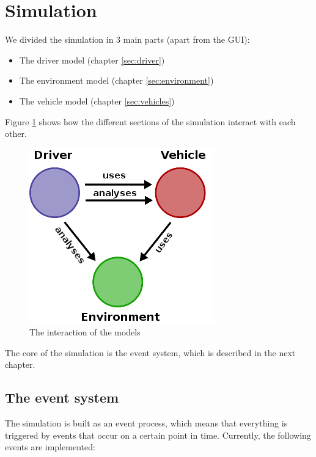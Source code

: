 
\section{Simulation}
\label{sec:simulation}

We divided the simulation in 3 main parts (apart from the GUI): \\

\begin{itemize}
\item The driver model (chapter \ref{sec:driver})
\item The environment model (chapter \ref{sec:environment})
\item The vehicle model (chapter \ref{sec:vehicles})
\end{itemize} 

\noindent Figure \ref{fig:simulationProcess} shows how the different sections
of the simulation interact with each other.

\begin{figure}[H]
\begin{center}
\includegraphics[scale=0.5]{images/process.png}
\end{center}
\caption{The interaction of the models}
\label{fig:simulationProcess}
\end{figure}

\noindent The core of the simulation is the event system, which is described in
the next chapter.

\subsection{The event system}
\label{sec:eventSystem}

The simulation is built as an event process, which means that everything is
triggered by events that occur on a certain point in time. Currently,
the following events are implemented:

